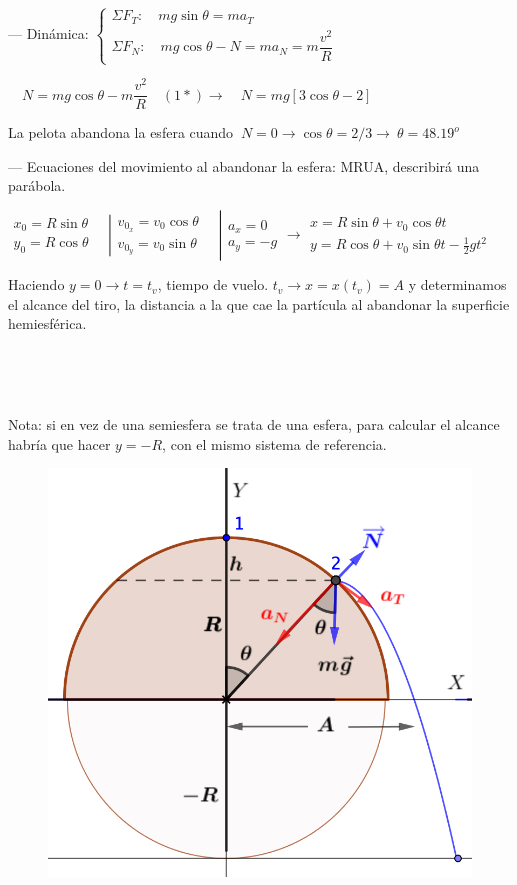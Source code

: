 --- Dinámica: $\begin{cases} \Sigma F_T: \quad mg\sin \theta=ma_T \\ \Sigma F_N:\quad mg\cos \theta-N=ma_N=m\dfrac {v^2}R \end{cases}$

$ \quad  N=mg\cos \theta-m\dfrac {v^2}R \quad (1*) \to \quad N=mg[3\cos \theta - 2]$

La pelota abandona la esfera cuando $\ N=0\to \cos \theta =2/3 \to \ \theta =48.19^o$

--- Ecuaciones del movimiento al abandonar la esfera: MRUA, describirá una parábola.

$\left. \begin{matrix}
x_0=R\sin \theta \quad \\ y_0=R \cos \theta \quad 	
 \end{matrix} \right|
 \left. \begin{matrix}
 v_{0_x}=v_0 \cos \theta \quad \\ v_{0_y}=v_0 \sin \theta \quad 	
 \end{matrix} \right|
 \left. \begin{matrix}
 a_x=0 \ \ \\ a_y=-g	
 \end{matrix} \right.
 \to 
 \left. \begin{matrix}
 	x=R \sin \theta + v_0 \cos \theta t \quad \quad \quad \\
 	y=R \cos \theta +  v_0 \sin \theta t - \frac 1 2 g t^2 \ 
 \end{matrix} \right.$

Haciendo $y=0 \to t=t_v$, tiempo de vuelo. $t_v \to x=x(t_v)=A$ y determinamos el alcance del tiro, la distancia a la que cae la partícula al abandonar la superficie hemiesférica.


$\quad$

$\quad$

Nota: si en vez de una semiesfera se trata de una esfera, para calcular el alcance habría que hacer $y=-R$, con el mismo sistema de referencia.

\begin{figure}[H]
	\centering
	\includegraphics[width=.6\textwidth]{imagenes/imagenes04/T04IM23.png}
\end{figure}


